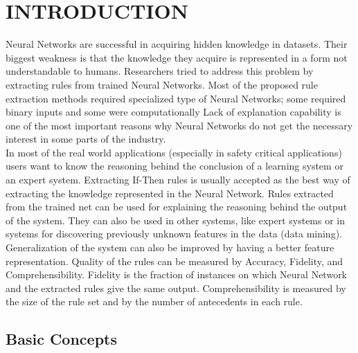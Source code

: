 \documentclass[a4paper,14pt,onecolumn]{article}
\begin{document}
\pagestyle{empty}







\newpage
\thispagestyle{empty}
\tableofcontents		%

\newpage
\listoftables


\newpage
\listoffigures

\newpage
{} %
\section{INTRODUCTION}
 Neural Networks are successful in acquiring hidden knowledge in datasets. Their biggest weakness is that the knowledge they acquire is represented in a form not understandable to humans. Researchers tried to address this problem by extracting rules from trained Neural Networks. Most of the proposed rule extraction methods required specialized type of Neural Networks; some required binary inputs and some were computationally Lack of explanation capability is one of the most important reasons why Neural Networks do not get the necessary interest in some parts of the industry.\\
          In most of the real world applications (especially in safety critical applications) users want to know the reasoning behind the conclusion of a learning system or an expert system. Extracting If-Then rules is usually accepted as the best way of extracting the knowledge represented in the Neural Network. Rules extracted from the trained net can be used for explaining the reasoning behind the output of the system. They can also be used in other systems, like expert systems or in systems for discovering previously unknown features in the data (data mining).\\ 
          Generalization of the system can also be improved by having a better feature representation. Quality of the rules can be measured by Accuracy, Fidelity, and Comprehensibility. Fidelity is the fraction of instances on which Neural Network and the extracted rules give the same output. Comprehensibility is measured by the size of the rule set and by the number of antecedents in each rule.

\subsection{Basic Concepts}
\end{document}
